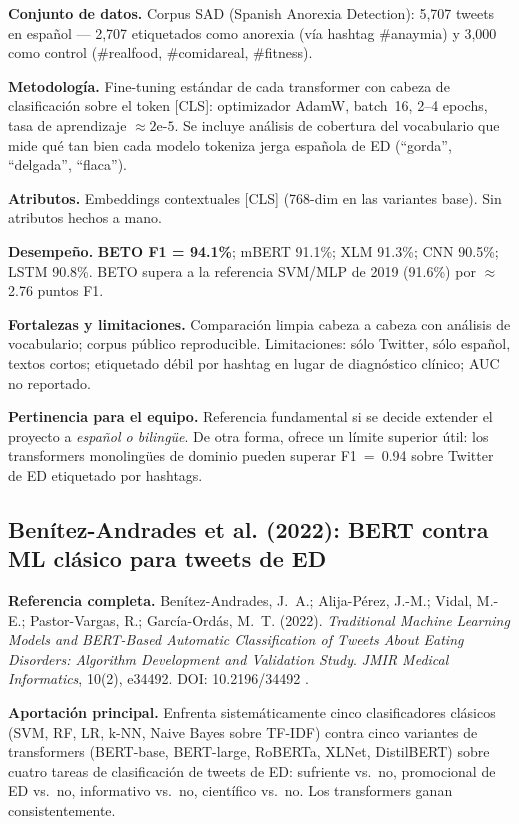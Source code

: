 \documentclass[journal]{IEEEtran}
\begin{document}
\textbf{Conjunto de datos.} Corpus SAD (Spanish Anorexia Detection): 5{,}707 tweets en español --- 2{,}707 etiquetados como anorexia (vía hashtag \#anaymia) y 3{,}000 como control (\#realfood, \#comidareal, \#fitness).

\textbf{Metodología.} Fine-tuning estándar de cada transformer con cabeza de clasificación sobre el token [CLS]: optimizador AdamW, batch~16, 2--4 epochs, tasa de aprendizaje $\approx 2\text{e-}5$. Se incluye análisis de cobertura del vocabulario que mide qué tan bien cada modelo tokeniza jerga española de ED (``gorda'', ``delgada'', ``flaca'').

\textbf{Atributos.} Embeddings contextuales [CLS] (768-dim en las variantes base). Sin atributos hechos a mano.

\textbf{Desempeño.} \textbf{BETO F1 = 94.1\%}; mBERT 91.1\%; XLM 91.3\%; CNN 90.5\%; LSTM 90.8\%. BETO supera a la referencia SVM/MLP de 2019 (91.6\%) por $\approx$2.76 puntos F1.

\textbf{Fortalezas y limitaciones.} Comparación limpia cabeza a cabeza con análisis de vocabulario; corpus público reproducible. Limitaciones: sólo Twitter, sólo español, textos cortos; etiquetado débil por hashtag en lugar de diagnóstico clínico; AUC no reportado.

\textbf{Pertinencia para el equipo.} Referencia fundamental si se decide extender el proyecto a \emph{español o bilingüe}. De otra forma, ofrece un límite superior útil: los transformers monolingües de dominio pueden superar F1~=~0.94 sobre Twitter de ED etiquetado por hashtags.

\subsection{Benítez-Andrades et al. (2022): BERT contra ML clásico para tweets de ED}

\textbf{Referencia completa.} Benítez-Andrades, J.~A.; Alija-Pérez, J.-M.; Vidal, M.-E.; Pastor-Vargas, R.; García-Ordás, M.~T. (2022). \emph{Traditional Machine Learning Models and BERT-Based Automatic Classification of Tweets About Eating Disorders: Algorithm Development and Validation Study}. \textit{JMIR Medical Informatics}, 10(2), e34492. DOI: 10.2196/34492 \cite{benitez2022bert}.

\textbf{Aportación principal.} Enfrenta sistemáticamente cinco clasificadores clásicos (SVM, RF, LR, k-NN, Naive Bayes sobre TF-IDF) contra cinco variantes de transformers (BERT-base, BERT-large, RoBERTa, XLNet, DistilBERT) sobre cuatro tareas de clasificación de tweets de ED: sufriente vs.~no, promocional de ED vs.~no, informativo vs.~no, científico vs.~no. Los transformers ganan consistentemente.
\end{document}
